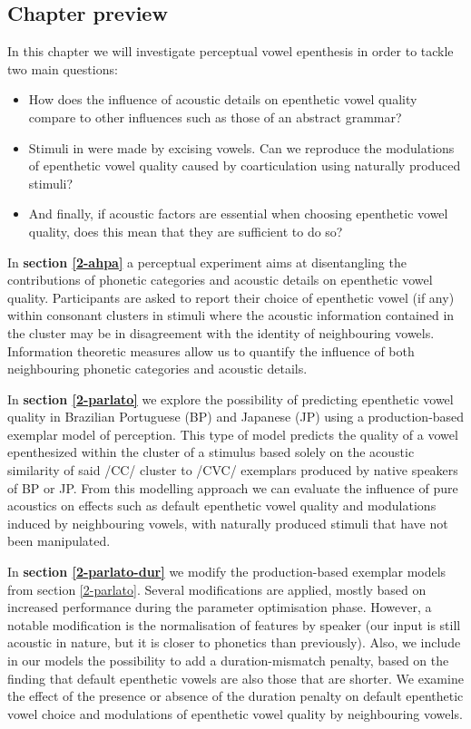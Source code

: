 \subsection{Chapter preview}

In this chapter we will investigate perceptual vowel epenthesis in order to tackle two main questions: 

\begin{itemize}
\item How does the influence of acoustic details on epenthetic vowel quality compare to other influences such as those of an abstract grammar?
\item Stimuli in \cite{dupoux2011} were made by excising vowels. Can we reproduce the modulations of epenthetic vowel quality caused by coarticulation using naturally produced stimuli?
\item And finally, if acoustic factors are essential when choosing epenthetic vowel quality, does this mean that they are sufficient to do so?
\end{itemize}

In \textbf{section \ref{2-ahpa}} a perceptual experiment aims at disentangling the contributions of phonetic categories and acoustic details on epenthetic vowel quality. Participants are asked to report their choice of epenthetic vowel (if any) within consonant clusters in stimuli where the acoustic information contained in the cluster may be in disagreement with the identity of neighbouring vowels. Information theoretic measures allow us to quantify the influence of both neighbouring phonetic categories and acoustic details.

In \textbf{section \ref{2-parlato}} we explore the possibility of predicting epenthetic vowel quality in Brazilian Portuguese (BP) and Japanese (JP) using a production-based exemplar model of perception. This type of model predicts the quality of a vowel epenthesized within the cluster of a stimulus based solely on the acoustic similarity of said /CC/ cluster to /CVC/ exemplars produced by native speakers of BP or JP. From this modelling approach we can evaluate the influence of pure acoustics on effects such as default epenthetic vowel quality and modulations induced by neighbouring vowels, with naturally produced stimuli that have not been manipulated.

In \textbf{section \ref{2-parlato-dur}} we modify the production-based exemplar models from section \ref{2-parlato}. Several modifications are applied, mostly based on increased performance during the parameter optimisation phase. However, a notable modification is the normalisation of features by speaker (our input is still acoustic in nature, but it is closer to phonetics than previously). Also, we include in our models the possibility to add a duration-mismatch penalty, based on the finding that default epenthetic vowels are also those that are shorter. We examine the effect of the presence or absence of the duration penalty on default epenthetic vowel choice and modulations of epenthetic vowel quality by neighbouring vowels.   

